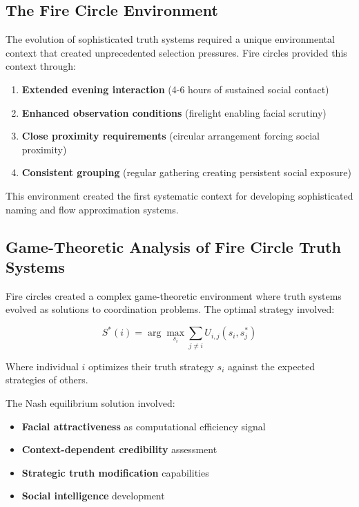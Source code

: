 \documentclass[12pt]{article}
\begin{document}
\subsection{The Fire Circle Environment}

The evolution of sophisticated truth systems required a unique environmental context that created unprecedented selection pressures. Fire circles provided this context through:

\begin{enumerate}
\item \textbf{Extended evening interaction} (4-6 hours of sustained social contact)
\item \textbf{Enhanced observation conditions} (firelight enabling facial scrutiny)
\item \textbf{Close proximity requirements} (circular arrangement forcing social proximity)
\item \textbf{Consistent grouping} (regular gathering creating persistent social exposure)
\end{enumerate}

This environment created the first systematic context for developing sophisticated naming and flow approximation systems.

\subsection{Game-Theoretic Analysis of Fire Circle Truth Systems}

Fire circles created a complex game-theoretic environment where truth systems evolved as solutions to coordination problems. The optimal strategy involved:

$$S^*(i) = \arg\max_{s_i} \sum_{j \neq i} U_{i,j}(s_i, s_j^*)$$

Where individual $i$ optimizes their truth strategy $s_i$ against the expected strategies of others.

The Nash equilibrium solution involved:

\begin{itemize}
\item \textbf{Facial attractiveness} as computational efficiency signal
\item \textbf{Context-dependent credibility} assessment
\item \textbf{Strategic truth modification} capabilities
\item \textbf{Social intelligence} development
\end{itemize}
\end{document}
